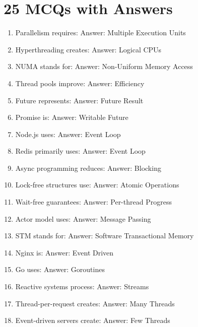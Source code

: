 \section{25 MCQs with Answers}

\begin{enumerate}
\item Parallelism requires:
Answer: Multiple Execution Units

\item Hyperthreading creates:
Answer: Logical CPUs

\item NUMA stands for:
Answer: Non-Uniform Memory Access

\item Thread pools improve:
Answer: Efficiency

\item Future represents:
Answer: Future Result

\item Promise is:
Answer: Writable Future

\item Node.js uses:
Answer: Event Loop

\item Redis primarily uses:
Answer: Event Loop

\item Async programming reduces:
Answer: Blocking

\item Lock-free structures use:
Answer: Atomic Operations

\item Wait-free guarantees:
Answer: Per-thread Progress

\item Actor model uses:
Answer: Message Passing

\item STM stands for:
Answer: Software Transactional Memory

\item Nginx is:
Answer: Event Driven

\item Go uses:
Answer: Goroutines

\item Reactive systems process:
Answer: Streams

\item Thread-per-request creates:
Answer: Many Threads

\item Event-driven servers create:
Answer: Few Threads


\end{enumerate}
